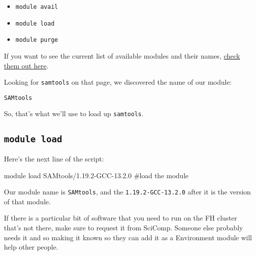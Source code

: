 \documentclass[
  letterpaper,
  DIV=11,
  numbers=noendperiod]{scrreprt}
\newenvironment{Shaded}{\begin{snugshade}}{\end{snugshade}}
\newcommand{\CommentTok}[1]{\textcolor[rgb]{0.37,0.37,0.37}{#1}}
\newcommand{\ExtensionTok}[1]{\textcolor[rgb]{0.00,0.23,0.31}{#1}}
\newcommand{\NormalTok}[1]{\textcolor[rgb]{0.00,0.23,0.31}{#1}}
\providecommand{\tightlist}{%
  \setlength{\itemsep}{0pt}\setlength{\parskip}{0pt}}
\begin{document}
\begin{itemize}
\tightlist
\item
  \texttt{module\ avail}
\item
  \texttt{module\ load}
\item
  \texttt{module\ purge}
\end{itemize}

If you want to see the current list of available modules and their
names,
\href{https://sciwiki.fredhutch.org/scicomputing/compute_scientificSoftware/}{check
them out here}.

Looking for \texttt{samtools} on that page, we discovered the name of
our module:

\begin{verbatim}
SAMtools
\end{verbatim}

So, that's what we'll use to load up \texttt{samtools}.

\subsection{\texorpdfstring{\texttt{module\ load}}{module load}}\label{module-load}

Here's the next line of the script:

\begin{Shaded}
\begin{Highlighting}[]
\ExtensionTok{module}\NormalTok{ load SAMtools/1.19.2{-}GCC{-}13.2.0  }\CommentTok{\#load the module}
\end{Highlighting}
\end{Shaded}

Our module name is \texttt{SAMtools}, and the \texttt{1.19.2-GCC-13.2.0}
after it is the version of that module.

\begin{tcolorbox}[enhanced jigsaw, colbacktitle=quarto-callout-note-color!10!white, left=2mm, toprule=.15mm, toptitle=1mm, opacityback=0, bottomrule=.15mm, breakable, leftrule=.75mm, colframe=quarto-callout-note-color-frame, bottomtitle=1mm, titlerule=0mm, coltitle=black, title=\textcolor{quarto-callout-note-color}{\faInfo}\hspace{0.5em}{For FH Users: Modules benefit everyone}, rightrule=.15mm, arc=.35mm, opacitybacktitle=0.6, colback=white]

If there is a particular bit of software that you need to run on the FH
cluster that's not there, make sure to request it from SciComp. Someone
else probably needs it and so making it known so they can add it as a
Environment module will help other people.

\end{tcolorbox}
\end{document}
